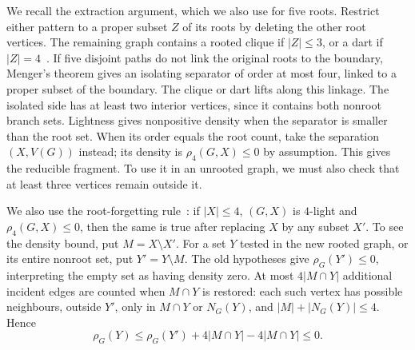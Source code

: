We recall the extraction argument, which we also use for five roots.
Restrict either pattern to a proper subset $Z$ of its roots by deleting
the other root vertices. The remaining graph contains a rooted clique
if $|Z|\leq3$, or a dart if $|Z|=4$~\cite[Observation~4.1]{DNR2026}.
If five disjoint paths do not link the original roots to the boundary,
Menger's theorem gives an isolating separator of order at most four,
linked to a proper subset of the boundary. The clique or dart lifts
along this linkage. The isolated side has at least two interior vertices,
since it contains both nonroot branch sets. Lightness gives nonpositive
density when the separator is smaller than the root set. When its order
equals the root count, take the separation $(X,V(G))$ instead; its density is
$\rho_4(G,X)\leq0$ by assumption.
This gives the reducible fragment. To use it in an unrooted graph,
we must also check that at least three vertices remain outside it.

We also use the root-forgetting rule~\cite[Observation~5.2]{DNR2026}:
if $|X|\leq4$, $(G,X)$ is $4$-light and $\rho_4(G,X)\leq0$, then
the same is true after replacing $X$ by any subset $X'$. To see the
density bound, put $M=X\setminus X'$. For a set $Y$ tested in the
new rooted graph, or its entire nonroot set, put $Y'=Y\setminus M$.
The old hypotheses give $\rho_G(Y')\leq0$, interpreting the empty
set as having density zero. At most $4|M\cap Y|$ additional incident
edges are counted when $M\cap Y$ is restored: each such vertex has
possible neighbours, outside $Y'$, only in $M\cap Y$ or $N_G(Y)$,
and $|M|+|N_G(Y)|\leq4$. Hence
\[
 \rho_G(Y)\leq\rho_G(Y')+4|M\cap Y|-4|M\cap Y|\leq0.
\]
